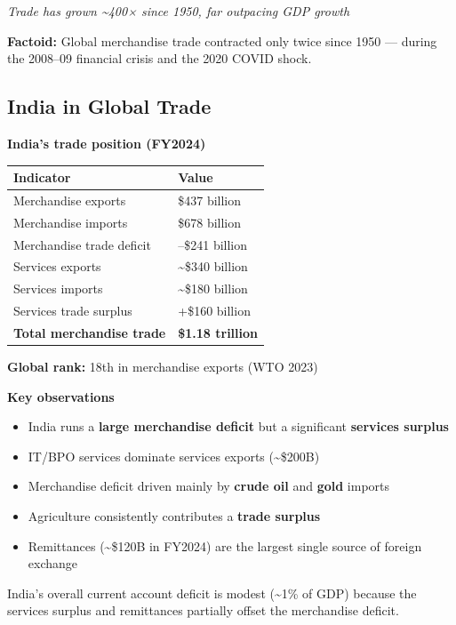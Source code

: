 \documentclass[
  letterpaper,
  DIV=11,
  numbers=noendperiod]{scrartcl}
\providecommand{\tightlist}{%
  \setlength{\itemsep}{0pt}\setlength{\parskip}{0pt}}
\begin{document}
\emph{Trade has grown \textasciitilde400× since 1950, far outpacing GDP
growth}

\textbf{Factoid:} Global merchandise trade contracted only twice since
1950 --- during the 2008--09 financial crisis and the 2020 COVID shock.

\subsection{India in Global Trade}\label{india-in-global-trade}

\textbf{India's trade position (FY2024)}

\begin{longtable}[]{@{}ll@{}}
\toprule\noalign{}
Indicator & Value \\
\midrule\noalign{}
\endhead
\bottomrule\noalign{}
\endlastfoot
Merchandise exports & \$437 billion \\
Merchandise imports & \$678 billion \\
Merchandise trade deficit & --\$241 billion \\
Services exports & \textasciitilde\$340 billion \\
Services imports & \textasciitilde\$180 billion \\
Services trade surplus & +\$160 billion \\
\textbf{Total merchandise trade} & \textbf{\$1.18 trillion} \\
\end{longtable}

\textbf{Global rank:} {18th} in merchandise exports (WTO 2023)

\textbf{Key observations}

\begin{itemize}
\tightlist
\item
  India runs a \textbf{large merchandise deficit} but a significant
  \textbf{services surplus}
\item
  IT/BPO services dominate services exports (\textasciitilde\$200B)
\item
  Merchandise deficit driven mainly by \textbf{crude oil} and
  \textbf{gold} imports
\item
  Agriculture consistently contributes a \textbf{trade surplus}
\item
  Remittances (\textasciitilde\$120B in FY2024) are the largest single
  source of foreign exchange
\end{itemize}

India's overall current account deficit is modest (\textasciitilde1\% of
GDP) because the services surplus and remittances partially offset the
merchandise deficit.
\end{document}
